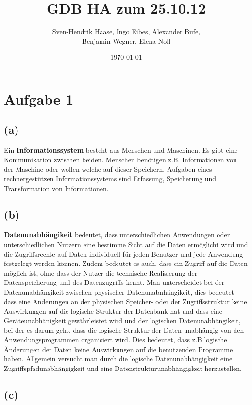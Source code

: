 \documentclass[12pt]{article}
\author{Sven-Hendrik Haase, Ingo Eibes, Alexander Bufe,\\Benjamin Wegner, Elena Noll}
\title{GDB HA zum 25.10.12}
\date{\today}
\begin{document}
\setcounter{secnumdepth}{0}
\maketitle

\section{Aufgabe 1}
\subsection{(a)}
Ein {\bf Informationssystem} besteht aus Menschen und Maschinen. Es gibt eine Kommunikation zwischen beiden.
Menschen benötigen z.B. Informationen von der Maschine oder wollen welche auf dieser Speichern.
Aufgaben eines rechnergestützen Informationssystems sind Erfassung, Speicherung und Transformation von Informationen.

\subsection{(b)}
{\bf Datenunabhängikeit} bedeutet, dass unterschiedlichen Anwendungen oder unterschiedlichen Nutzern eine bestimme Sicht auf
die Daten ermöglicht wird und die Zugriffsrechte auf Daten individuell für jeden Benutzer und jede Anwendung festgelegt
werden können. Zudem bedeutet es auch, dass ein Zugriff auf die Daten möglich ist, ohne dass der Nutzer die technische
Realisierung der Datenspeicherung und des Datenzugriffs kennt. Man unterscheidet bei der Datenunabhängikeit zwischen
physischer Datenunabnhängikeit, dies bedeutet, dass eine Änderungen an der physischen Speicher- oder der Zugriffsstruktur
keine Auswirkungen auf die logische Struktur der Datenbank hat und dass eine Geräteunabhänigkeit gewährleistet wird und
der logischen Datenunabhängikeit, bei der es darum geht, dass die logische Struktur der Daten unabhängig von den 
Anwendungsprogrammen organisiert wird. Dies bedeutet, dass z.B logische Änderungen der Daten keine Auswirkungen auf 
die benutzenden Programme haben. Allgemein versucht man durch die logische Datenunabhängigkeit eine Zugriffspfadunabhängigkeit
und eine Datenstrukturunabhängigkeit herzustellen.

\subsection{(c)}
\end{document}
